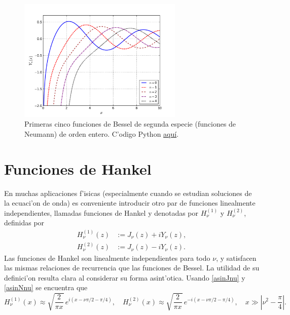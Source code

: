 \begin{figure}[H]
\centering
\includegraphics[angle=0,width=0.7\textwidth]{figs/fig-Bessel-Y.pdf}
\caption{Primeras cinco funciones de Bessel de segunda especie (funciones de Neumann) de orden entero. C'odigo Python \href{https://github.com/gfrubi/FM2/blob/master/figuras-editables/fig-Bessel.py}{aqu\'i}.}
\label{fig-Nn}
\end{figure}

\section{Funciones de Hankel}
En muchas aplicaciones f'isicas (especialmente cuando se estudian soluciones de la ecuaci'on de onda) es conveniente introducir otro par de funciones linealmente independientes, llamadas funciones de Hankel y denotadas por $H_\nu^{(1)}$ y $H_\nu^{(2)}$, definidas por
\begin{align}
  H_\nu^{(1)}(z) &:= J_\nu(z) + i Y_\nu(z),  \\
  H_\nu^{(2)}(z) &:= J_\nu(z) - i Y_\nu(z) .
\end{align}
Las funciones de Hankel son linealmente independientes para todo $\nu$, y satisfacen las mismas relaciones de recurrencia que las funciones de Bessel.
La utilidad de su definici'on resulta clara al considerar su forma asint'otica. Usando \eqref{asinJnu} y \eqref{asinNnu} se encuentra que
\begin{equation}
H_\nu^{(1)}(x)\approx \sqrt{\frac{2}{\pi x}}\,e^{i(x-\nu\pi/2-\pi/4)}, \quad 
H_\nu^{(2)}(x)\approx \sqrt{\frac{2}{\pi x}}\,e^{-i(x-\nu\pi/2-\pi/4)}, 
\quad x\gg\left|\nu^2-\frac{\pi}{4}\right|.
\end{equation}

